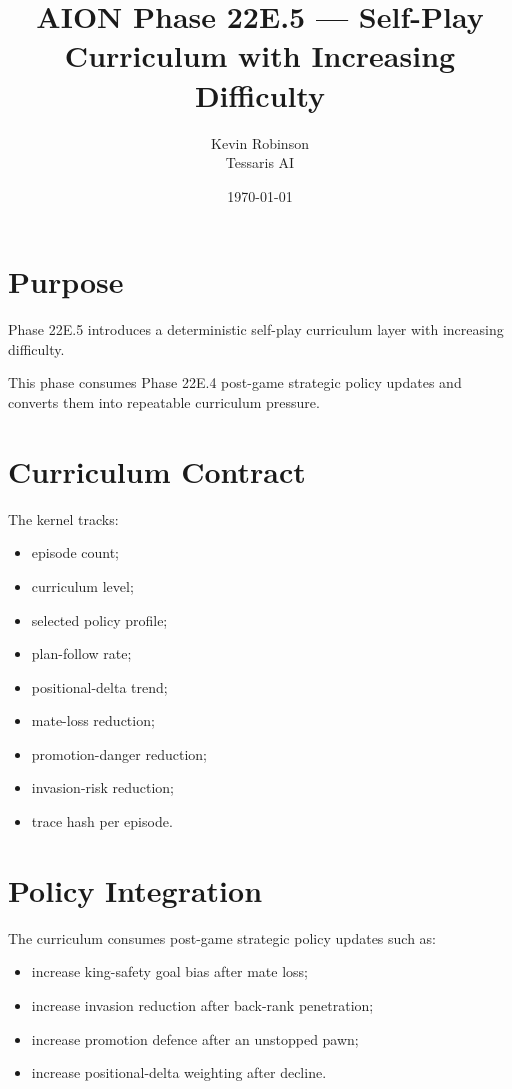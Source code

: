 \documentclass[11pt,a4paper]{article}
\title{\textbf{AION Phase 22E.5 --- Self-Play Curriculum with Increasing Difficulty}}
\author{Kevin Robinson\\Tessaris AI}
\date{\today}
\begin{document}
\maketitle

\section{Purpose}

Phase 22E.5 introduces a deterministic self-play curriculum layer with increasing difficulty.

This phase consumes Phase 22E.4 post-game strategic policy updates and converts them into repeatable curriculum pressure.

\section{Curriculum Contract}

The kernel tracks:

\begin{itemize}[leftmargin=*]
  \item episode count;
  \item curriculum level;
  \item selected policy profile;
  \item plan-follow rate;
  \item positional-delta trend;
  \item mate-loss reduction;
  \item promotion-danger reduction;
  \item invasion-risk reduction;
  \item trace hash per episode.
\end{itemize}

\section{Policy Integration}

The curriculum consumes post-game strategic policy updates such as:

\begin{itemize}[leftmargin=*]
  \item increase king-safety goal bias after mate loss;
  \item increase invasion reduction after back-rank penetration;
  \item increase promotion defence after an unstopped pawn;
  \item increase positional-delta weighting after decline.
\end{itemize}
\end{document}
